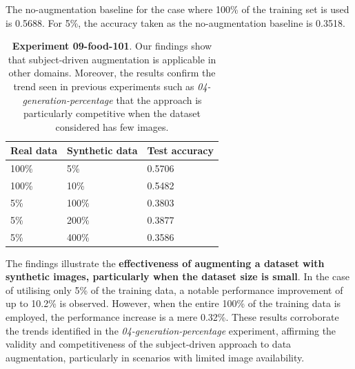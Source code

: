 The no-augmentation baseline for the case where 100\% of the training set is used is 0.5688. For 5\%, the accuracy taken as the no-augmentation baseline is 0.3518.

\begin{table}[ht]
\centering
\begin{tabular}{|l|l|l|}
\hline
\rowcolor[HTML]{BFBFBF} 
\textbf{Real data} & \textbf{Synthetic data} & \textbf{Test accuracy} \\ \hline
100\% & 5\% & 0.5706 \\ \hline
100\% & 10\% & 0.5482 \\ \hline
5\% & 100\% & 0.3803 \\ \hline
5\% & 200\% & 0.3877 \\ \hline
5\% & 400\% & 0.3586 \\ \hline
\end{tabular}
\caption{\textbf{Experiment 09-food-101}. Our findings show that subject-driven augmentation is applicable in other domains. Moreover, the results confirm the trend seen in previous experiments such as \textit{04-generation-percentage} that the approach is particularly competitive when the dataset considered has few images.}
\label{table:TableExp09}
\end{table}

The findings illustrate the \textbf{effectiveness of augmenting a dataset with synthetic images, particularly when the dataset size is small}. In the case of utilising only 5\% of the training data, a notable performance improvement of up to 10.2\% is observed. However, when the entire 100\% of the training data is employed, the performance increase is a mere 0.32\%. These results corroborate the trends identified in the \textit{04-generation-percentage} experiment, affirming the validity and competitiveness of the subject-driven approach to data augmentation, particularly in scenarios with limited image availability.

